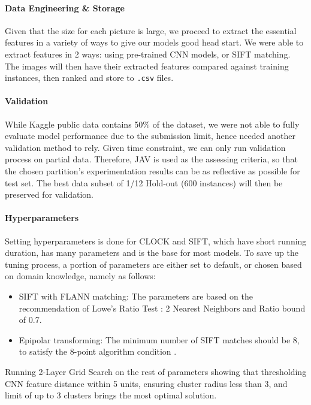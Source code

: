 \documentclass[11pt]{article}
\begin{document}
\begin{multicols}{2}
\paragraph{Data Engineering \& Storage} Given that the size for each picture is large, we proceed to extract the essential features in a variety of ways to give our models good head start. We were able to extract features in 2 ways: using pre-trained CNN models, or SIFT matching. The images will then have their extracted features compared against training instances, then ranked and store to \texttt{.csv} files.

\paragraph{Validation} While Kaggle public data contains 50\% of the dataset, we were not able to fully evaluate model performance due to the submission limit, hence needed another validation method to rely. Given time constraint, we can only run validation process on partial data. Therefore, JAV is used as the assessing criteria, so that the chosen partition's experimentation results can be as reflective as possible for test set. The best data subset of 1/12 Hold-out (600 instances) will then be preserved for validation.

\paragraph{Hyperparameters} Setting hyperparameters is done for CLOCK and SIFT, which have short running duration, has many parameters and is the base for most models. To save up the tuning process, a portion of parameters are either set to default, or chosen based on domain knowledge, namely as follows:
\begin{itemize}
    \item SIFT with FLANN matching: The parameters are based on the recommendation of Lowe's Ratio Test \cite{Lowe}: 2 Nearest Neighbors and Ratio bound of 0.7.
    \item Epipolar transforming: The minimum number of SIFT matches should be 8, to satisfy the 8-point algorithm condition \cite{8pt}.
\end{itemize}
\noindent Running 2-Layer Grid Search on the rest of parameters showing that thresholding CNN feature distance within 5 units, ensuring cluster radius less than 3, and limit of up to 3 clusters brings the most optimal solution.

\vspace{-0.3cm}

\end{multicols}
\end{document}
